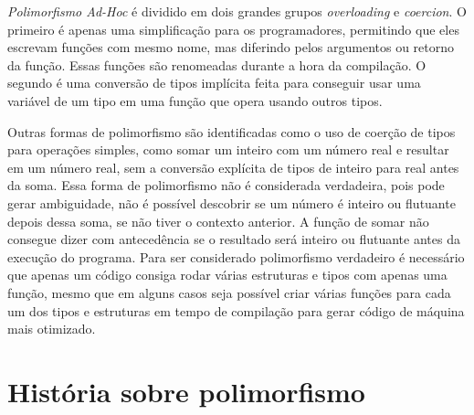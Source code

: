 \documentclass{article}
\begin{document}
\emph{Polimorfismo Ad-Hoc} é dividido em dois grandes grupos \emph{overloading} e \emph{coercion}. O primeiro é apenas uma simplificação para os programadores, permitindo que eles escrevam funções com mesmo nome, mas diferindo pelos argumentos ou retorno da função. Essas funções são renomeadas durante a hora da compilação. O segundo é uma conversão de tipos implícita feita para conseguir usar uma variável de um tipo em uma função que opera usando outros tipos.

Outras formas de polimorfismo são identificadas como o uso de coerção de tipos para operações simples, como somar um inteiro com um número real e resultar em um número real, sem a conversão explícita de tipos de inteiro para real antes da soma. Essa forma de polimorfismo não é considerada verdadeira, pois pode gerar ambiguidade, não é possível descobrir se um número é inteiro ou flutuante depois dessa soma, se não tiver o contexto anterior. A função de somar não consegue dizer com antecedência se o resultado será inteiro ou flutuante antes da execução do programa. 
Para ser considerado polimorfismo verdadeiro é necessário que apenas um código consiga rodar várias estruturas e tipos com apenas uma função, mesmo que em alguns casos seja possível criar várias funções para cada um dos tipos e estruturas em tempo de compilação para gerar código de máquina mais otimizado.

\section{História sobre polimorfismo}
\end{document}
